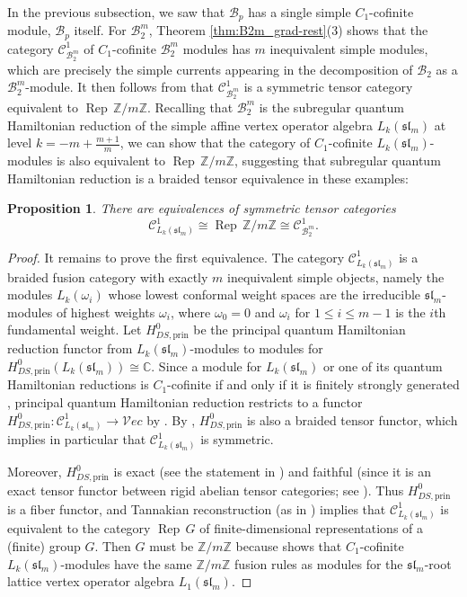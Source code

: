 \documentclass[11pt, reqno]{amsart}
\newtheorem{prop}[thm]{Proposition}
\theoremstyle{definition}\newtheorem{defi}[thm]{Definition}
\theoremstyle{definition}\newtheorem{rem}[thm]{Remark}
\theoremstyle{definition}\newtheorem{exam}[thm]{Example}
\theoremstyle{definition}\newtheorem{assum}[thm]{Assumption}
\newcommand{\cB}{\mathcal{B}}
\newcommand{\cV}{\mathcal{V}}
\newcommand{\cC}{\mathcal{C}}
\newcommand{\CC}{\mathbb{C}}
\newcommand{\ZZ}{\mathbb{Z}}
\DeclareMathOperator{\rep}{Rep}
\begin{document}
In the previous subsection, we saw that $\cB_p$ has a single simple $C_1$-cofinite module, $\cB_p$ itself. For $\cB_2^m$, Theorem \ref{thm:B2m_grad-rest}(3) shows that the category $\cC^1_{\cB_2^m}$ of $C_1$-cofinite $\cB_2^m$ modules has $m$ inequivalent simple modules, which are precisely the simple currents appearing in the decomposition of $\cB_2$ as a $\cB_2^m$-module. It then follows from \cite[Corollary 4.8]{McR-orb1} that $\cC_{\cB_2^m}^1$ is a symmetric tensor category equivalent to $\rep\,\ZZ /m\ZZ$. Recalling that $\cB_2^m$ is the subregular quantum Hamiltonian reduction of the simple affine vertex operator algebra $L_k(\mathfrak{sl}_m)$ at level $k = -m + \frac{m+1}{m}$, we can show that the category of $C_1$-cofinite $L_k(\mathfrak{sl}_m)$-modules is also equivalent to $\rep\,\ZZ/m\ZZ$, suggesting that subregular quantum Hamiltonian reduction is a braided tensor equivalence in these examples:
\begin{prop}\label{prop:qHr_braided_tensor?}
There are equivalences of symmetric tensor categories 
\begin{equation*}
\cC^1_{L_k(\mathfrak{sl}_m)}\cong\rep\,\ZZ/m\ZZ\cong\cC_{\cB_2^m}^1.
\end{equation*}
\end{prop}
\begin{proof}
It remains to prove the first equivalence. The category $\cC^1_{L_k(\mathfrak{sl}_m)}$ is a braided fusion category \cite{Cr2} with exactly $m$ inequivalent simple objects, namely the modules  $L_{k}( \omega_i)$ 
 whose lowest conformal weight spaces are the irreducible $\mathfrak{sl}_m$-modules of highest weights $\omega_i$, where $\omega_0 =0$ and $\omega_i$ for $1\leq i\leq m-1$ is the $i$th fundamental weight. Let $H^0_{DS,\text{prin}}$ be the principal quantum Hamiltonian reduction functor from $L_k(\mathfrak{sl}_m)$-modules to modules for $H^0_{DS,\text{prin}}(L_k(\mathfrak{sl}_m))\cong\CC$. Since a module for $L_k(\mathfrak{sl}_m)$ or one of its quantum Hamiltonian reductions is $C_1$-cofinite if and only if it is finitely strongly generated \cite[Lemma 3.1.6]{Ar-assoc-var}, principal quantum Hamiltonian reduction restricts to a functor $H^0_{DS,\text{prin}}: \cC^1_{L_k(\mathfrak{sl}_m)}\rightarrow\cV ec$ by \cite[Corollary 4.5.10]{Ar-C2}. By \cite[Theorem 10.4]{ACF}, $H^0_{DS,\text{prin}}$ is also a braided tensor functor, which implies in particular that $\cC^1_{L_k(\mathfrak{sl}_m)}$ is symmetric.
 
 Moreover, $H^0_{DS,\text{prin}}$ is exact (see the statement in \cite[Theorem 3.1]{ACF}) and faithful (since it is an exact tensor functor between rigid abelian tensor categories; see \cite[Proposition 1.19]{DM}). Thus $H^0_{DS,\text{prin}}$ is a fiber functor, and Tannakian reconstruction (as in \cite[Theorem 2.11]{DM}) implies that $\cC^1_{L_k(\mathfrak{sl}_m)}$ is equivalent to the category $\rep\,G$ of finite-dimensional representations of a (finite) group $G$. Then $G$ must be $\ZZ/m\ZZ$ because \cite[Corollary 7.4]{Cr2} shows that $C_1$-cofinite $L_k(\mathfrak{sl}_m)$-modules have the same $\ZZ/m\ZZ$ fusion rules as modules for the $\mathfrak{sl}_m$-root lattice vertex operator algebra $L_1(\mathfrak{sl}_m)$. 
\end{proof}
\end{document}
